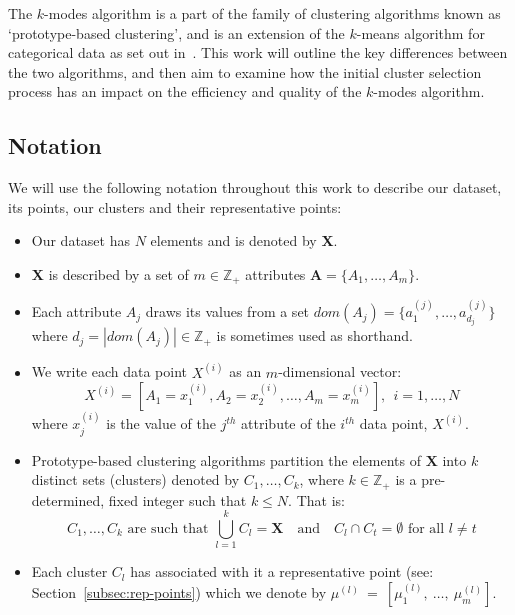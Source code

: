 The \(k\)-modes algorithm is a part of the family of clustering algorithms known 
as `prototype-based clustering', and is an extension of the \(k\)-means 
algorithm for categorical data as set out in~\cite{Huang98}. This work will 
outline the key differences between the two algorithms, and then aim to 
examine how the initial cluster selection process has an impact on the 
efficiency and quality of the \(k\)-modes algorithm.\\


\subsection{Notation}\label{subsec:notation}

We will use the following notation throughout this work to describe our dataset,
its points, our clusters and their representative points:

\begin{itemize}
    \item Our dataset has \(N\) elements and is denoted by \textbf{X}.
    \item \textbf{X} is described by a set of \(m \in \mathbb{Z}_+\) attributes 
        \(\textbf{A} = \{A_1, \ldots, A_m\}\).
    \item Each attribute \(A_j\) draws its values from a set \(dom(A_j) = 
        \{a_1^{(j)}, \ldots, a_{d_j}^{(j)}\}\) where \(d_j = |dom(A_j)| \in 
        \mathbb{Z}_+\) is sometimes used as shorthand.
    \item We write each data point \(X^{(i)}\) as an \(m\)-dimensional vector:
	\[
		X^{(i)} = \left[A_1 = x_1^{(i)}, A_2 = x_2^{(i)}, \ldots, A_m = 
        x_m^{(i)}\right], \ \ i=1, \ldots, N
	\]
        where \(x_j^{(i)}\) is the value of the \(j^{th}\) attribute of the
        \(i^{th}\) data point, \(X^{(i)}\).
	\item Prototype-based clustering algorithms partition the elements of 
        \(\textbf{X}\) into \(k\) distinct sets (clusters) denoted by \(C_1, 
        \ldots, C_k\), where \(k \in \mathbb{Z}_+\) is a pre-determined, fixed 
        integer such that \(k \le N\). That is:
	\[
		C_1, \ldots, C_k \text{ are such that } \bigcup_{l=1}^k C_l = 
		\textbf{X} \quad \text{and} \quad C_l \cap C_t = \emptyset 
		\text{ for all } l \neq t
	\]
    \item Each cluster \(C_l\) has associated with it a representative point 
		(see: Section~\ref{subsec:rep-points}) which we denote by 
        \(\mu^{(l)}~=~\left[\mu_1^{(l)},~\ldots,~\mu_m^{(l)}\right]\).
\end{itemize}


